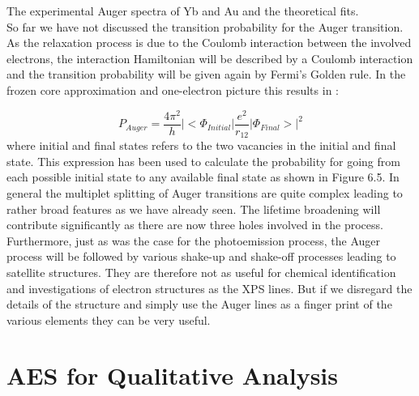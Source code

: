           \vspace*{15cm}
           The experimental Auger spectra of
          Yb and Au and the theoretical fits.\\


          So far we have not discussed the transition  probability  for
          the Auger transition. As the relaxation process  is  due  to
          the Coulomb interaction between the involved  electrons,  the
          interaction Hamiltonian  will  be  described  by  a  Coulomb
          interaction and the transition  probability  will  be  given
          again  by  Fermi's  Golden  rule.   In   the   frozen   core
          approximation and one-electron picture this results in \cite{wentzel}:

          \begin{equation}
           P_{Auger}=\frac{4\pi^{2}}{h}|<\Phi_{Initial}|\frac{e^{2}}{r_{12}}|\Phi_{Final}>|^{2}
          \end{equation}
          where initial and final states refers to the  two  vacancies
          in the initial and final state.  This  expression  has  been
          used to  calculate  the  probability  for  going  from  each
          possible initial state to any available final state as shown
          in Figure 6.5. In general the  multiplet splitting  of
          Auger transitions are quite complex leading to rather  broad
          features as we have already seen.  The  lifetime  broadening
          will contribute significantly as there  are now three  holes
          involved in the process. Furthermore, just as was  the  case
          for the photoemission process, the  Auger  process  will  be
          followed by various shake-up and shake-off  processes  leading
          to satellite structures. They are therefore  not  as  useful
          for chemical identification and investigations  of  electron
          structures as the XPS lines. But if we disregard the  details
          of the structure and simply use the Auger lines as a  finger
          print of the various elements they can be very useful.











               \section{AES for Qualitative Analysis}


